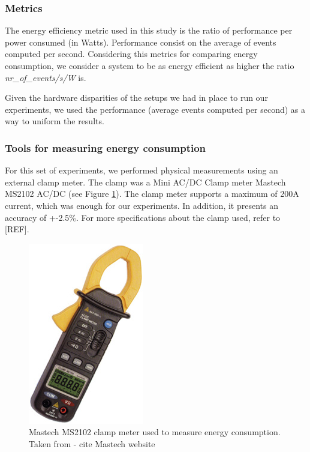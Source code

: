 \subsubsection*{Metrics}
The energy efficiency metric used in this study is the ratio of performance per power consumed (in Watts). Performance consist on the average of events computed per second. Considering this metrics for comparing energy consumption, we consider a system to be as energy efficient as higher the ratio \textit{nr\_of\_events/s/W} is.

Given the hardware disparities of the setups we had in place to run our experiments, we used the performance (average events computed per second) as a way to uniform the results.

\subsubsection*{Tools for measuring energy consumption}
For this set of experiments, we performed physical measurements using an external clamp meter. The clamp was a Mini AC/DC Clamp meter
Mastech MS2102 AC/DC (see Figure \ref{fig:clamp}). The clamp meter supports a maximum of 200A current, which was enough for our experiments. In addition, it presents an accuracy of +-2.5\%. For more specifications about the clamp used, refer to [REF].

\begin{figure}[]
  \centering
    \includegraphics[scale=2.5]{"img/clamp"}
    \caption{Mastech MS2102 clamp meter used to measure energy consumption. Taken from \cite{} - cite Mastech website}
    \label{fig:clamp}
\end{figure}


